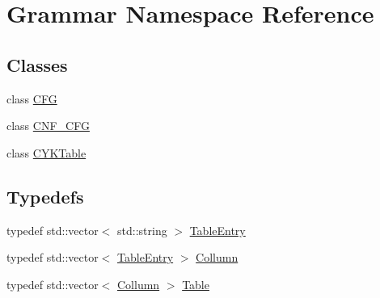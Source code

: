 \hypertarget{namespaceGrammar}{\section{\-Grammar \-Namespace \-Reference}
\label{d0/da6/namespaceGrammar}
}
\subsection*{\-Classes}
\begin{DoxyCompactItemize}
\item 
class \hyperlink{classGrammar_1_1CFG}{\-C\-F\-G}
\item 
class \hyperlink{classGrammar_1_1CNF__CFG}{\-C\-N\-F\-\_\-\-C\-F\-G}
\item 
class \hyperlink{classGrammar_1_1CYKTable}{\-C\-Y\-K\-Table}
\end{DoxyCompactItemize}
\subsection*{\-Typedefs}
\begin{DoxyCompactItemize}
\item 
typedef std\-::vector$<$ std\-::string $>$ \hyperlink{namespaceGrammar_a1d9fbc78aa4b224969964f71642a1e62}{\-Table\-Entry}
\item 
typedef std\-::vector$<$ \hyperlink{namespaceGrammar_a1d9fbc78aa4b224969964f71642a1e62}{\-Table\-Entry} $>$ \hyperlink{namespaceGrammar_ab0ca0e61019c21f20260968164e53945}{\-Collumn}
\item 
typedef std\-::vector$<$ \hyperlink{namespaceGrammar_ab0ca0e61019c21f20260968164e53945}{\-Collumn} $>$ \hyperlink{namespaceGrammar_ac36a2ef8f0596f29dde458d3d9917e88}{\-Table}
\end{DoxyCompactItemize}


